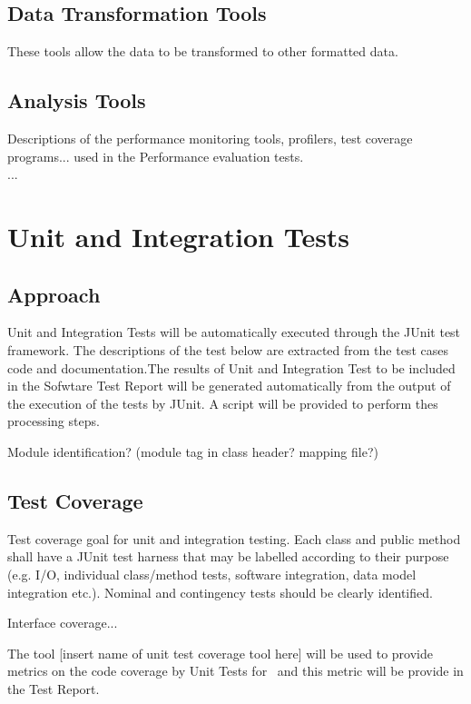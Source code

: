 \documentclass[CUx,lsstdraft,STP]{lsstdoc}
\begin{document}
\subsection{Data Transformation Tools}
These tools allow the data to be transformed to other formatted data.

\subsection{Analysis Tools}
Descriptions of the performance monitoring tools, profilers, test coverage programs... used in the Performance evaluation tests.\\
...

\section{Unit and Integration Tests}

\subsection{Approach}

Unit and Integration Tests will be automatically executed through the JUnit test framework. The descriptions of the test below are extracted from the test cases code and documentation.The results of Unit and Integration Test to be included in the Sofwtare Test Report will be generated automatically from the output of the execution of the tests by JUnit. A script will be provided to perform thes processing steps.

Module identification? (module tag in class header? mapping file?)

\subsection{Test Coverage}

Test coverage goal for unit and integration testing. Each class and public method shall have a JUnit test harness that may be labelled according to their purpose (e.g. I/O, individual class/method tests, software integration, data model integration etc.). Nominal and contingency
tests should be clearly identified.

Interface coverage...

The tool [insert name of unit test coverage tool here] will be used to provide metrics on the code coverage by Unit Tests for \product \ and this metric will be provide in the Test Report.
\end{document}
